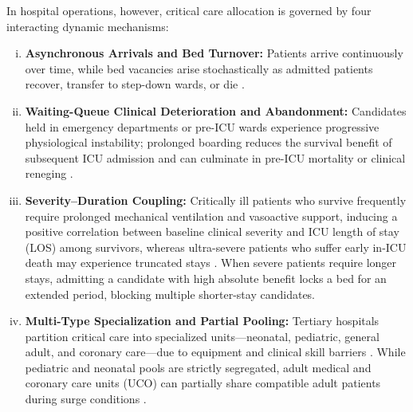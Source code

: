 \documentclass[final,5p,times,twocolumn]{elsarticle}
\begin{document}
In hospital operations, however, critical care allocation is governed by four interacting dynamic mechanisms:
\begin{enumerate}[(i)]
    \item \textbf{Asynchronous Arrivals and Bed Turnover:} Patients arrive continuously over time, while bed vacancies arise stochastically as admitted patients recover, transfer to step-down wards, or die \cite{chan2012optimizing, kim2015association, Bilbao_2022}.
    \item \textbf{Waiting-Queue Clinical Deterioration and Abandonment:} Candidates held in emergency departments or pre-ICU wards experience progressive physiological instability; prolonged boarding reduces the survival benefit of subsequent ICU admission and can culminate in pre-ICU mortality or clinical reneging \cite{cardoso2011impact, sun2018patient}.
    \item \textbf{Severity--Duration Coupling:} Critically ill patients who survive frequently require prolonged mechanical ventilation and vasoactive support, inducing a positive correlation between baseline clinical severity and ICU length of stay (LOS) among survivors, whereas ultra-severe patients who suffer early in-ICU death may experience truncated stays \cite{zampieri2019icu, soares2024update}. When severe patients require longer stays, admitting a candidate with high absolute benefit locks a bed for an extended period, blocking multiple shorter-stay candidates.
    \item \textbf{Multi-Type Specialization and Partial Pooling:} Tertiary hospitals partition critical care into specialized units---neonatal, pediatric, general adult, and coronary care---due to equipment and clinical skill barriers \cite{king2019modelling, guinsburg2016death}. While pediatric and neonatal pools are strictly segregated, adult medical and coronary care units (UCO) can partially share compatible adult patients during surge conditions \cite{Valeva_2023}.
\end{enumerate}
\end{document}
